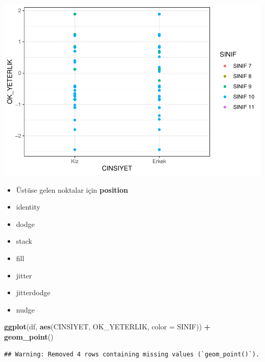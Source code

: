 \documentclass[
  oneside]{book}
\newenvironment{Shaded}{\begin{snugshade}}{\end{snugshade}}
\newcommand{\AttributeTok}[1]{\textcolor[rgb]{0.13,0.29,0.53}{#1}}
\newcommand{\FunctionTok}[1]{\textcolor[rgb]{0.13,0.29,0.53}{\textbf{#1}}}
\newcommand{\NormalTok}[1]{#1}
\newcommand{\SpecialCharTok}[1]{\textcolor[rgb]{0.81,0.36,0.00}{\textbf{#1}}}
\begin{document}
\begin{center}\includegraphics[width=1\linewidth]{15-betimleyici-istatistik_files/figure-latex/unnamed-chunk-42-1} \end{center}

\begin{itemize}
\item
  Üstüse gelen noktalar için \textbf{position}
\item
  identity
\item
  dodge
\item
  stack
\item
  fill
\item
  jitter
\item
  jitterdodge
\item
  nudge
\end{itemize}

\begin{Shaded}
\begin{Highlighting}[]
\FunctionTok{ggplot}\NormalTok{(df, }\FunctionTok{aes}\NormalTok{(CINSIYET, OK\_YETERLIK, }\AttributeTok{color =}\NormalTok{ SINIF)) }\SpecialCharTok{+}
  \FunctionTok{geom\_point}\NormalTok{()}
\end{Highlighting}
\end{Shaded}

\begin{verbatim}
## Warning: Removed 4 rows containing missing values (`geom_point()`).
\end{verbatim}
\end{document}
